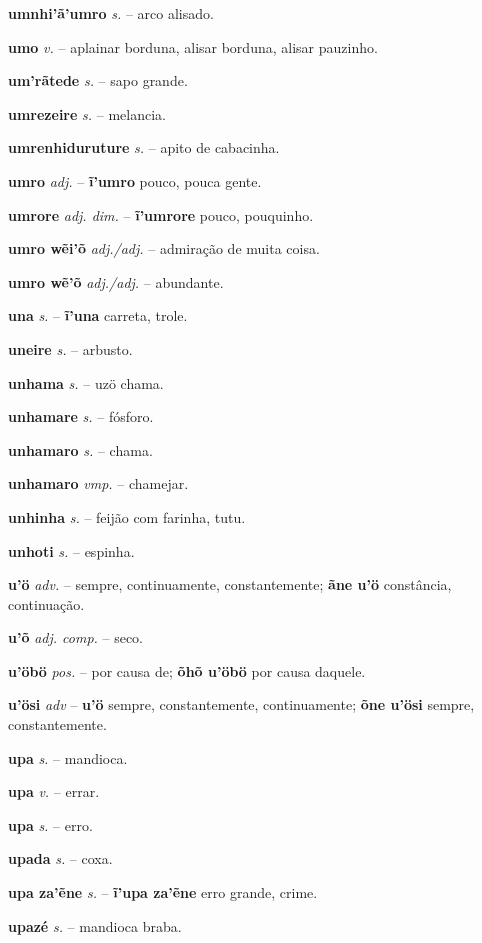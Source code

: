 \textbf{umnhi'ã'umro} \textit{s.} -- arco alisado.

\textbf{umo} \textit{v.} -- aplainar borduna, alisar borduna, alisar pauzinho.

\textbf{um'rãtede} \textit{s.} -- sapo grande.

\textbf{umrezeire} \textit{s.} -- melancia.

\textbf{umrenhiduruture} \textit{s.} -- apito de cabacinha.

\textbf{umro} \textit{adj.} -- \textbf{ĩ'umro} pouco, pouca gente.

\textbf{umrore} \textit{adj. dim.} -- \textbf{ĩ'umrore} pouco, pouquinho.

\textbf{umro wẽi'õ} \textit{adj./adj.} -- admiração de muita coisa.

\textbf{umro wẽ'õ} \textit{adj./adj.} -- abundante.

\textbf{una} \textit{s.} -- \textbf{ĩ'una} carreta, trole.

\textbf{uneire} \textit{s.} -- arbusto.

\textbf{unhama} \textit{s.} -- uzö chama.

\textbf{unhamare} \textit{s.} -- fósforo.

\textbf{unhamaro} \textit{s.} -- chama.

\textbf{unhamaro} \textit{vmp.} -- chamejar.

\textbf{unhinha} \textit{s.} -- feijão com farinha, tutu.

\textbf{unhoti} \textit{s.} -- espinha.

\textbf{u'ö} \textit{adv.} -- sempre, continuamente, constantemente; \textbf{ãne u'ö} constância, continuação.

\textbf{u'õ} \textit{adj. comp.} -- seco.

\textbf{u'öbö} \textit{pos.} -- por causa de; \textbf{õhõ u'öbö} por causa daquele.

\textbf{u'ösi} \textit{adv} -- \textbf{u'ö} sempre, constantemente, continuamente; \textbf{õne u'ösi} sempre, constantemente.

\textbf{upa} \textit{s.} -- mandioca.

\textbf{upa} \textit{v.} -- errar.

\textbf{upa} \textit{s.} -- erro.

\textbf{upada} \textit{s.} -- coxa.

\textbf{upa za'ẽne} \textit{s.} -- \textbf{ĩ'upa za'ẽne} erro grande, crime.

\textbf{upazé} \textit{s.} -- mandioca braba.

